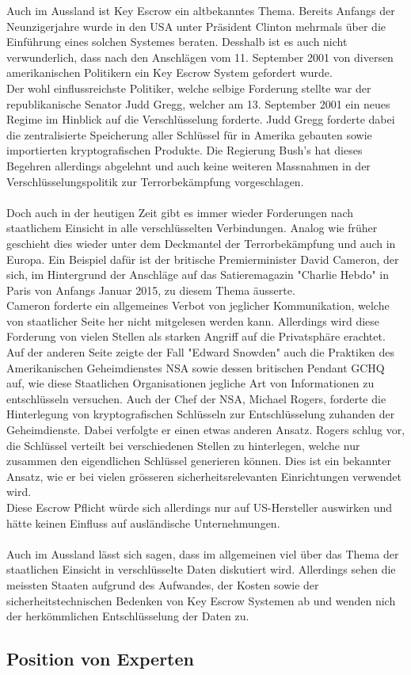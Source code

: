 Auch im Aussland ist Key Escrow ein altbekanntes Thema. Bereits Anfangs der Neunzigerjahre wurde in den USA unter Präsident Clinton mehrmals über die Einführung eines solchen Systemes beraten. \cite{null} %
Desshalb ist es auch nicht verwunderlich, dass nach den Anschlägen vom 11. September 2001 von diversen amerikanischen Politikern ein Key Escrow System gefordert wurde. \\
Der wohl einflussreichste Politiker, welche selbige Forderung stellte war der republikanische Senator Judd Gregg, welcher am 13. September 2001 ein neues Regime im Hinblick auf die Verschlüsselung forderte. Judd Gregg forderte dabei die zentralisierte Speicherung aller Schlüssel für in Amerika gebauten sowie importierten kryptografischen Produkte. Die Regierung Bush's hat dieses Begehren allerdings abgelehnt und auch keine weiteren Massnahmen in der Verschlüsselungspolitik zur Terrorbekämpfung vorgeschlagen. \cite{null}\\ %
\\
Doch auch in der heutigen Zeit gibt es immer wieder Forderungen nach staatlichem Einsicht in alle verschlüsselten Verbindungen. Analog wie früher geschieht dies wieder unter dem Deckmantel der Terrorbekämpfung und auch in Europa. Ein Beispiel dafür ist der britische Premierminister David Cameron, der sich, im Hintergrund der Anschläge auf das Satieremagazin "Charlie Hebdo" in Paris von Anfangs Januar 2015, zu diesem Thema äusserte. \\
Cameron forderte ein allgemeines Verbot von jeglicher Kommunikation, welche von staatlicher Seite her nicht mitgelesen werden kann. Allerdings wird diese Forderung von vielen Stellen als starken Angriff auf die Privatsphäre erachtet. \cite{null} \\%
Auf der anderen Seite zeigte der Fall "Edward Snowden" auch die Praktiken des Amerikanischen Geheimdienstes NSA sowie dessen britischen Pendant GCHQ auf, wie diese Staatlichen Organisationen jegliche Art von Informationen zu entschlüsseln versuchen. Auch der Chef der NSA, Michael Rogers, forderte die Hinterlegung von kryptografischen Schlüsseln zur Entschlüsselung zuhanden der Geheimdienste. Dabei verfolgte er einen etwas anderen Ansatz. Rogers schlug vor, die Schlüssel verteilt bei verschiedenen Stellen zu hinterlegen, welche nur zusammen den eigendlichen Schlüssel generieren können. Dies ist ein bekannter Ansatz, wie er bei vielen grösseren sicherheitsrelevanten Einrichtungen verwendet wird. \\
Diese Escrow Pflicht würde sich allerdings nur auf US-Hersteller auswirken und hätte keinen Einfluss auf ausländische Unternehmungen. \cite{null} \\ %
\\
Auch im Aussland lässt sich sagen, dass im allgemeinen viel über das Thema der staatlichen Einsicht in verschlüsselte Daten diskutiert wird. Allerdings sehen die meissten Staaten aufgrund des Aufwandes, der Kosten sowie der sicherheitstechnischen Bedenken von Key Escrow Systemen ab und wenden nich der herkömmlichen Entschlüsselung der Daten zu.


		
	\subsection{Position von Experten}
